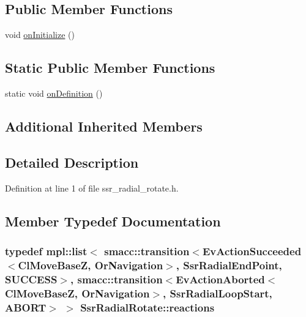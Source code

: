 \subsection*{Public Member Functions}
\begin{DoxyCompactItemize}
\item 
void \hyperlink{structSsrRadialRotate_a91b3de3b25e4cf0d3a672f6ea344abea}{on\+Initialize} ()
\end{DoxyCompactItemize}
\subsection*{Static Public Member Functions}
\begin{DoxyCompactItemize}
\item 
static void \hyperlink{structSsrRadialRotate_a96e76900952f342ee6591b84168f927f}{on\+Definition} ()
\end{DoxyCompactItemize}
\subsection*{Additional Inherited Members}


\subsection{Detailed Description}


Definition at line 1 of file ssr\+\_\+radial\+\_\+rotate.\+h.



\subsection{Member Typedef Documentation}
\subsubsection[{\texorpdfstring{reactions}{reactions}}]{\setlength{\rightskip}{0pt plus 5cm}typedef mpl\+::list$<$ {\bf smacc\+::transition}$<$Ev\+Action\+Succeeded$<$Cl\+Move\+BaseZ, Or\+Navigation$>$, {\bf Ssr\+Radial\+End\+Point}, {\bf S\+U\+C\+C\+E\+SS}$>$, {\bf smacc\+::transition}$<$Ev\+Action\+Aborted$<$Cl\+Move\+BaseZ, Or\+Navigation$>$, {\bf Ssr\+Radial\+Loop\+Start}, {\bf A\+B\+O\+RT}$>$ $>$ {\bf Ssr\+Radial\+Rotate\+::reactions}}\hypertarget{structSsrRadialRotate_ab3188b2cc27335cc88a33a63abd38ee0}{}\label{structSsrRadialRotate_ab3188b2cc27335cc88a33a63abd38ee0}


